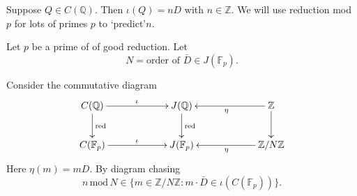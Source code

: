 \documentclass{beamer}
\newcommand{\Q}{{\mathbb Q}}
\newcommand{\Z}{{\mathbb Z}}
\newcommand{\F}{{\mathbb F}}
\theoremstyle{definition}
\theoremstyle{remark}
\begin{document}
\begin{frame}
Suppose $Q \in C(\Q)$. Then $\iota(Q)=nD$ with $n \in \Z$.
We will use reduction mod $p$ for lots of primes $p$
to \lq predict\rq $n$.

\bigskip

Let $p$ be a prime of
of good reduction. Let 
\[
N=\text{order of $\bar{D} \in J(\F_p)$}. 
\]

Consider the commutative diagram
\[
\xymatrixcolsep{5pc}
\xymatrix{
C(\Q) \ar^{\iota}[r] \ar^{\mathrm{red}}[d]  & J(\Q) 
\ar[d]^{\mathrm{red}} & \Z \ar^{\eta}[l]    \ar[d]\\
C(\F_p) \ar^{\iota}[r] & J(\F_p)   & \Z/N\Z \ar^{\eta}[l] \\
}
\]
Here $\eta(m)=mD$.
By diagram chasing
\[
n \, \mathrm{mod} \, N \in \{ m \in \Z/N\Z : m \cdot \bar{D} \in \iota(C(\F_p)) \}.
\]
\end{frame}
\end{document}
